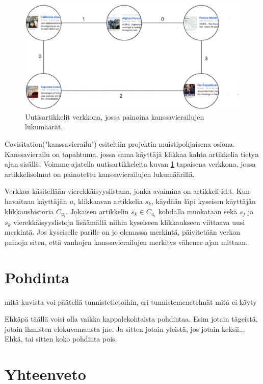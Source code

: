 \documentclass[12pt,finnish]{tktltiki2}
\theoremstyle{definition}
\theoremstyle{remark}
\begin{document}
\begin{figure}[]
\includegraphics[width = 390pt]{verkko.eps}\caption{Uutisartikkelit verkkona, jossa painoina kanssavierailujen lukumäärät.}
\label{verkko}
\end{figure} 

Covisitation("kanssavierailu") esiteltiin projektin muistipohjaisena osiona. Kanssavierailu on tapahtuma, jossa sama käyttäjä klikkaa kahta artikkelia tietyn ajan sisällä. Voimme ajatella uutisartikkeleita kuvan \ref{verkko} tapaisena verkkona, jossa artikkelisolmut on painotettu kanssavierailujen lukumäärillä.   

Verkkoa käsitellään vierekkäisyyslistana, jonka avaimina on artikkeli-id:t.
Kun havaitaan käyttäjän $u_i$ klikkaavan artikkelia $s_k$, käydään läpi kyseisen käyttäjän klikkaushistoria $C_{u_{i}}$. Jokaisen artikkelin $s_k \in C_{u_{i}}$ kohdalla muokataan sekä $s_j$ ja $s_k$ vierekkäisyyslistoja lisäämällä niihin kyseiseen klikkaukseen viittaava uusi merkintä. Jos kyseiselle parille on jo olemassa merkintä, päivitetään verkon painoja siten, että vanhojen kanssavierailujen merkitys vähenee ajan mittaan.

\section{Pohdinta}
mitä kuvista voi päätellä tunnistetietoihin, eri tunnistemenetelmät mitä ei käyty

Ehkäpä täällä voisi olla vaikka kappalekohtaista pohdintaa. Esim jotain tägeistä, jotain ihmisten elokuvamausta jne. Ja sitten jotain yleistä, jos jotain keksii... Ehkä, tai sitten koko pohdinta pois.

        
\section{Yhteenveto}
\end{document}

